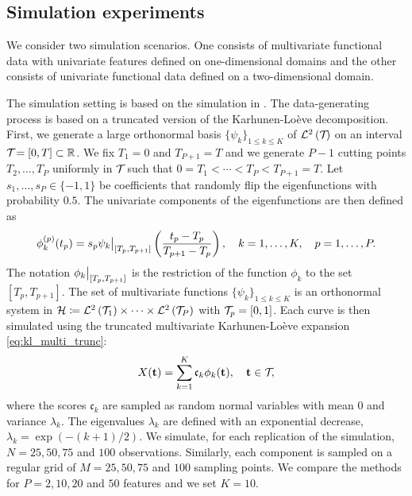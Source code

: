 \subsection{Simulation experiments} %
\label{sub:simulation_experiments}

We consider two simulation scenarios. One consists of multivariate functional data with univariate features defined on one-dimensional domains and the other consists of univariate functional data defined on a two-dimensional domain.

\begin{scenario}
The simulation setting is based on the simulation in \cite{happMultivariateFunctionalPrincipal2018a}. The data-generating process is based on a truncated version of the Karhunen-Loève decomposition. First, we generate a large orthonormal basis $\{\psi_k\}_{1 \leq k \leq K}$ of $\mathcal{L}^{2}\left(\mathcal{T}_{}\right)$ on an interval $\mathcal{T}_{} = [0, T] \subset \mathbb{R}$. We fix $T_1 = 0$ and $T_{P + 1} = T$ and we generate $P - 1$ cutting points $T_2, \dots, T_P$ uniformly in $\mathcal{T}_{}$ such that $0 = T_1 < \cdots < T_P < T_{P+1} = T$. Let $s_1, \dots, s_P \in \{-1, 1\}$ be coefficients that randomly flip the eigenfunctions with probability $0.5$. The univariate components of the eigenfunctions are then defined as
\begin{equation}\label{eq:simulation_uni_component}
    \phi_k^{(p)}(t_p) = s_p \restr{\psi_k}{[T_p, T_{p + 1}]}\left(\frac{t_p - T_p}{T_{p + 1} - T_p}\right), \quad k = 1, \dots, K, \quad p = 1, \dots, P.
\end{equation}
The notation $\restr{\phi_k}{[T_p, T_{p + 1}]}$ is the restriction of the function $\phi_k$ to the set $[T_p, T_{p + 1}]$. The set of multivariate functions $\{\psi_k\}_{1 \leq k \leq K}$ is an orthonormal system in $\mathcal{H} \coloneqq \mathcal{L}^{2}\left(\mathcal{T}_{1}\right) \times \dots \times \mathcal{L}^{2}\left(\mathcal{T}_{P}\right)$ with $\mathcal{T}_{p} = [0, 1]$. Each curve is then simulated using the truncated multivariate Karhunen-Loève expansion \eqref{eq:kl_multi_trunc}:
\begin{equation}
    X(\mathbf{t}) = \sum_{k = 1}^K \mathfrak{c}_k \phi_k(\mathbf{t}), \quad \mathbf{t} \in \mathcal{T}_{},
\end{equation}
where the scores $\mathfrak{c}_k$ are sampled as random normal variables with mean $0$ and variance $\lambda_k$. The eigenvalues $\lambda_k$ are defined with an exponential decrease, $\lambda_k = \exp(-(k + 1)/2)$. We simulate, for each replication of the simulation, $N = 25, 50, 75$ and $100$ observations. Similarly, each component is sampled on a regular grid of $M = 25, 50, 75$ and $100$ sampling points. We compare the methods for $P = 2, 10, 20$ and $50$ features and we set $K = 10$.
\end{scenario}

